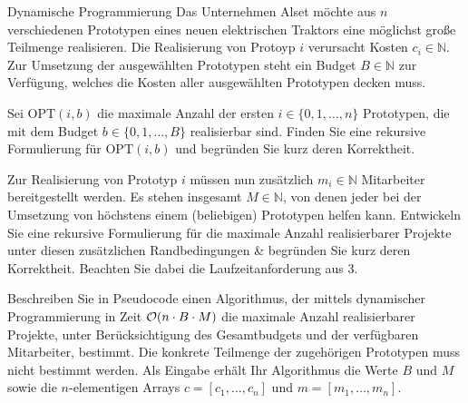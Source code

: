 \documentclass{exercisesheet}
\begin{document}
\begin{eexercises}{Dynamische Programmierung}{
    Das Unternehmen Alset möchte aus $n$ verschiedenen Prototypen eines neuen elektrischen Traktors eine möglichst große Teilmenge realisieren. Die Realisierung von Protoyp $i$ verursacht Kosten $c_i \in \mathbb{N}$. Zur Umsetzung der ausgewählten Prototypen steht ein Budget $B \in \mathbb{N}$ zur Verfügung, welches die Kosten aller ausgewählten Prototypen decken muss.
  }
  \item Sei $\text{OPT}(i, b)$ die maximale Anzahl der ersten $i \in \{0, 1, \ldots, n\}$ Prototypen, die mit dem Budget $b \in \{0, 1, \ldots, B\}$ realisierbar sind. Finden Sie eine rekursive Formulierung für $\text{OPT}(i, b)$ und begründen Sie kurz deren Korrektheit.
  \item Zur Realisierung von Prototyp $i$ müssen nun zusätzlich $m_i \in \mathbb{N}$ Mitarbeiter bereitgestellt werden. Es stehen insgesamt $M \in \mathbb{N}$, von denen jeder bei der Umsetzung von höchstens einem (beliebigen) Prototypen helfen kann. Entwickeln Sie eine rekursive Formulierung für die maximale Anzahl realisierbarer Projekte unter diesen zusätzlichen Randbedingungen \& begründen Sie kurz deren Korrektheit. Beachten Sie dabei die Laufzeitanforderung aus 3.
  \item Beschreiben Sie in Pseudocode einen Algorithmus, der mittels dynamischer Programmierung in Zeit $\mathcal{O}(n \cdot B \cdot M)$ die maximale Anzahl realisierbarer Projekte, unter Berücksichtigung des Gesamtbudgets und der verfügbaren Mitarbeiter, bestimmt. Die konkrete Teilmenge der zugehörigen Prototypen muss nicht bestimmt werden. Als Eingabe erhält Ihr Algorithmus die Werte $B$ und $M$ sowie die $n$-elementigen Arrays $c = [c_1, \ldots, c_n]$ und $m = [m_1, \ldots, m_n]$.
\end{eexercises}
\end{document}

